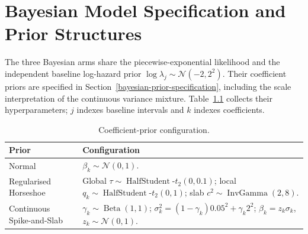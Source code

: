 \chapter{Bayesian Model Specification and Prior Structures}\label{appendix-d-bayesian-model-specification-and-prior-structures}\label{app:model-specification}

The three Bayesian arms share the piecewise-exponential likelihood and the independent baseline log-hazard prior $\log\lambda_j\sim\mathcal{N}(-2,2^2)$. Their coefficient priors are specified in Section~\ref{bayesian-prior-specification}, including the scale interpretation of the continuous variance mixture. Table~\ref{tab:prior-configuration} collects their hyperparameters; $j$ indexes baseline intervals and $k$ indexes coefficients.

\begin{table}[htbp]
\centering\small
\caption{Coefficient-prior configuration.}\label{tab:prior-configuration}
\begin{tabularx}{\textwidth}{@{}lX@{}}\toprule
Prior & Configuration\\\midrule
Normal & $\beta_k\sim\mathcal{N}(0,1)$.\\
Regularised Horseshoe & Global $\tau\sim\operatorname{HalfStudent}\text{-}t_2(0,0.1)$; local $q_k\sim\operatorname{HalfStudent}\text{-}t_2(0,1)$; slab $c^2\sim\operatorname{InvGamma}(2,8)$.\\
Continuous Spike-and-Slab & $\gamma_k\sim\operatorname{Beta}(1,1)$; $\sigma_k^2=(1-\gamma_k)0.05^2+\gamma_k2^2$; $\beta_k=z_k\sigma_k$, $z_k\sim\mathcal{N}(0,1)$.\\\bottomrule
\end{tabularx}
\end{table}
